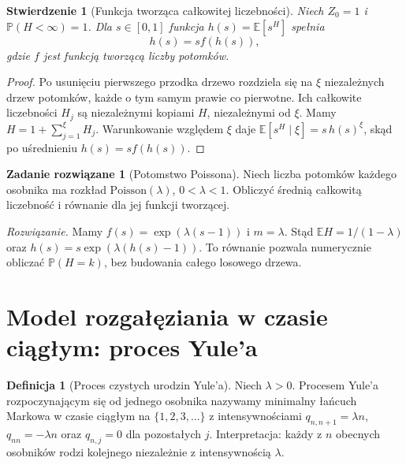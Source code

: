 \documentclass[11pt,a4paper,oneside]{report}
\numberwithin{equation}{chapter}
\theoremstyle{plain}
\newtheorem{stwierdzenie}[twierdzenie]{Stwierdzenie}
\theoremstyle{definition}
\newtheorem{definicja}{Definicja}[chapter]
\newtheorem{zadanie}{Zadanie rozwiązane}[chapter]
\theoremstyle{remark}
\newcommand{\Prob}{\mathbb{P}}
\newcommand{\E}{\mathbb{E}}
\begin{document}
\begin{stwierdzenie}[Funkcja tworząca całkowitej liczebności]
Niech $Z_0=1$ i $\Prob(H<\infty)=1$.
Dla $s\in[0,1]$ funkcja $h(s)=\E[s^H]$ spełnia
\[
h(s)=s f(h(s)),
\]
gdzie $f$ jest funkcją tworzącą liczby potomków.
\end{stwierdzenie}
\begin{proof}
Po usunięciu pierwszego przodka drzewo rozdziela się
na $\xi$ niezależnych drzew potomków, każde o tym samym
prawie co pierwotne. Ich całkowite liczebności $H_j$
są niezależnymi kopiami $H$, niezależnymi od $\xi$.
Mamy $H=1+\sum_{j=1}^\xi H_j$.
Warunkowanie względem $\xi$ daje
$\E[s^H\mid\xi]=s\,h(s)^\xi$, skąd po uśrednieniu
$h(s)=sf(h(s))$.
\end{proof}

\begin{zadanie}[Potomstwo Poissona]
Niech liczba potomków każdego osobnika ma rozkład
$\mathrm{Poisson}(\lambda)$, $0<\lambda<1$.
Obliczyć średnią całkowitą liczebność i równanie
dla jej funkcji tworzącej.

\emph{Rozwiązanie.} Mamy
$f(s)=\exp(\lambda(s-1))$ i $m=\lambda$.
Stąd $\E H=1/(1-\lambda)$ oraz
$h(s)=s\exp(\lambda(h(s)-1))$.
To równanie pozwala numerycznie obliczać
$\Prob(H=k)$, bez budowania całego losowego drzewa.
\end{zadanie}

\section{Model rozgałęziania w czasie ciągłym: proces Yule'a}
\begin{definicja}[Proces czystych urodzin Yule'a]
Niech $\lambda>0$. Procesem Yule'a rozpoczynającym się
od jednego osobnika nazywamy minimalny łańcuch Markowa
w czasie ciągłym na $\{1,2,3,\ldots\}$ z intensywnościami
$q_{n,n+1}=\lambda n$, $q_{nn}=-\lambda n$ oraz
$q_{n,j}=0$ dla pozostałych $j$.
Interpretacja: każdy z $n$ obecnych osobników rodzi
kolejnego niezależnie z intensywnością $\lambda$.
\end{definicja}
\end{document}
